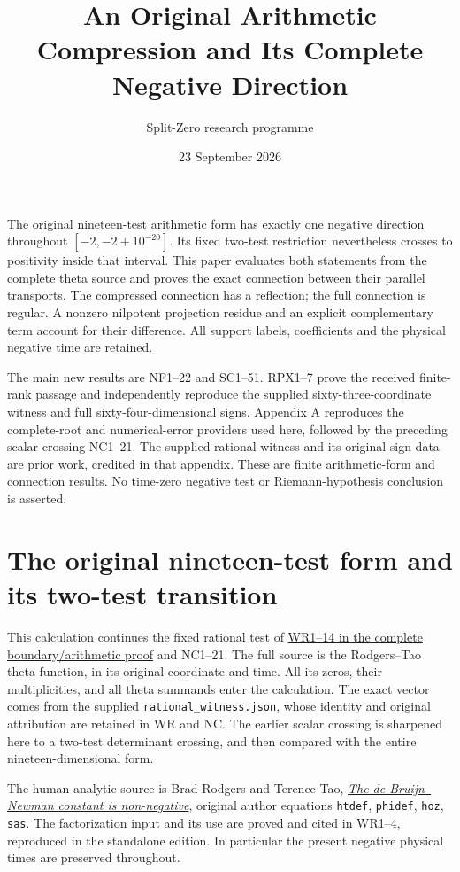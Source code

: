 \documentclass[11pt,a4paper]{article}
\title{An Original Arithmetic Compression and Its Complete Negative Direction}
\author{Split-Zero research programme}
\date{23 September 2026}
\theoremstyle{definition}\newtheorem{definition}[theorem]{Definition}
\begin{document}
\maketitle
The original nineteen-test arithmetic form has exactly one negative
direction throughout $[-2,-2+10^{-20}]$. Its fixed two-test restriction
nevertheless crosses to positivity inside that interval. This paper
evaluates both statements from the complete theta source and proves
the exact connection between their parallel transports. The compressed
connection has a reflection; the full connection is regular. A nonzero
nilpotent projection residue and an explicit complementary term account
for their difference. All support labels, coefficients and the physical
negative time are retained.

The main new results are NF1--22 and SC1--51. RPX1--7 prove the
received finite-rank passage and independently reproduce the supplied
sixty-three-coordinate witness and full sixty-four-dimensional signs.
Appendix A reproduces
the complete-root and numerical-error providers used here, followed by
the preceding scalar crossing NC1--21. The supplied rational witness
and its original sign data are prior work, credited in that appendix.
These are finite arithmetic-form and connection results. No time-zero
negative test or Riemann-hypothesis conclusion is asserted.
\tableofcontents
\clearpage
\section{The original nineteen-test form and its two-test transition}
\label{sec:native-full-flag}

This calculation continues the fixed rational test of
\href{https://github.com/KokunoYumeto/zeta-function-research-reader/blob/87e386271c488ce5914b9926c4d23d0857e0c367/workbenches/splitzero-tandem/continuations/20260923-boundary-residue-arithmetic/BOUNDARY_RESIDUE_ARITHMETIC_RECEIVERS.tex}
{WR1--14 in the complete boundary/arithmetic proof} and
NC1--21. The full source is the Rodgers--Tao theta function, in its
original coordinate and time. All its zeros, their multiplicities,
and all theta summands enter the calculation. The exact vector comes
from the supplied \texttt{rational\_witness.json}, whose identity and
original attribution are retained in WR and NC. The earlier scalar
crossing is sharpened here to a two-test determinant crossing, and
then compared with the entire nineteen-dimensional form.

The human analytic source is Brad Rodgers and Terence Tao,
\href{https://arxiv.org/abs/1801.05914v5}{\emph{The de Bruijn--Newman
constant is non-negative}}, original author equations
\texttt{htdef}, \texttt{phidef}, \texttt{hoz}, \texttt{sas}.
The factorization input and its use are proved and cited in WR1--4,
reproduced in the standalone edition. In particular the present
negative physical times are preserved throughout.
\end{document}
